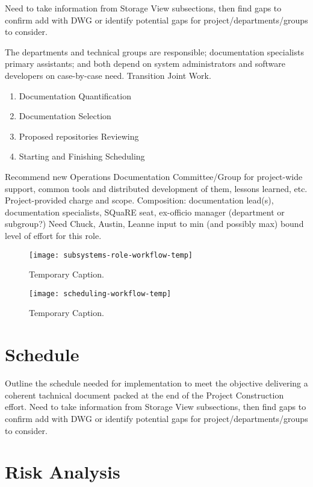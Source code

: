 Need to take information from Storage View subsections, then find gaps to confirm add with DWG or identify potential gaps for project/departments/groups to consider.

The departments and technical groups are responsible; documentation specialists primary assistants; and both depend on system administrators and software developers on case-by-case need.
Transition Joint Work.

\begin{enumerate}
        \item Documentation Quantification
        \item Documentation Selection
        \item Proposed repositories Reviewing
        \item Starting and Finishing Scheduling
\end{enumerate}

Recommend new Operations Documentation Committee/Group for project-wide support, common tools and distributed development of them, lessons learned, etc.
Project-provided charge and scope.
Composition: documentation lead(s), documentation specialists, SQuaRE seat, ex-officio manager (department or subgroup?)
Need Chuck, Austin, Leanne input to min (and possibly max) bound level of effort for this role.

\begin{figure}[t]
\caption{Temporary Caption.}
\centering
\texttt{[image: subsystems-role-workflow-temp]}
\label{fig:subsystems-role-workflow}
\end{figure}

\begin{figure}[t]
\caption{Temporary Caption.}
\centering
\texttt{[image: scheduling-workflow-temp]}
\label{fig:scheduling-workflow}
\end{figure}

\section{Schedule}

Outline the schedule needed for implementation to meet the objective delivering a coherent tachnical document packed at the end of the Project Construction effort.
Need to take information from Storage View subsections, then find gaps to confirm add with DWG or identify potential gaps for project/departments/groups to consider.


\section{Risk Analysis}

